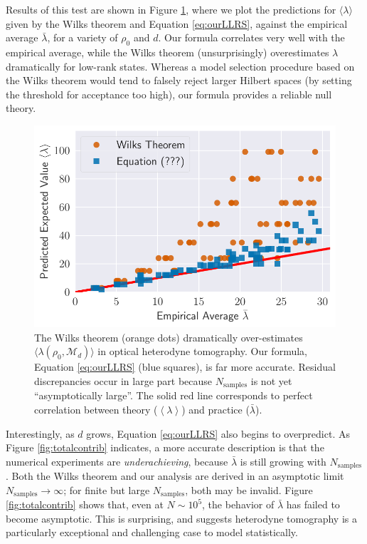 \documentclass[aps,pra, twocolumn]{revtex4-1}
\newcommand{\M}{\mathcal{M}}
\newcommand{\expect}[1]{\ensuremath{\left\langle#1\right\rangle}}
\begin{document}
Results of this test are shown in Figure \ref{fig:modelcomp}, where we plot the predictions for $\langle \lambda \rangle$ given by the Wilks theorem and Equation \eqref{eq:ourLLRS}, against the empirical average $\bar\lambda$, for a variety of $\rho_{0}$ and $d$. Our formula correlates very well with the empirical average, while the Wilks theorem (unsurprisingly) overestimates $\lambda$ dramatically for low-rank states.  Whereas a model selection procedure based on the Wilks theorem would tend to falsely reject larger Hilbert spaces (by setting the threshold for acceptance too high), our formula provides a reliable null theory.

\begin{figure}
 \includegraphics[width=\columnwidth]{Images/Figure_8.pdf}
 \caption{The Wilks theorem (orange dots) dramatically over-estimates $\langle\lambda(\rho_{0}, \M_{d})\rangle$ in optical heterodyne tomography. Our formula, Equation \ref{eq:ourLLRS} (blue squares), is far more accurate. Residual discrepancies occur in large part because $N_{\mathrm{samples}}$ is not yet ``asymptotically large''. The solid red line corresponds to perfect correlation between theory ($\expect{\lambda}$) and practice ($\bar\lambda$).}
 \label{fig:modelcomp}
\end{figure}

Interestingly, as $d$ grows, Equation \eqref{eq:ourLLRS} also begins to overpredict. As Figure \ref{fig:totalcontrib} indicates, a more accurate description is that the numerical experiments are \emph{underachieving}, because $\bar\lambda$ is still growing with $N_{\mathrm{samples}}$.  Both the Wilks theorem and our analysis are derived in an asymptotic limit $N_{\mathrm{samples}} \rightarrow \infty$; for finite but large $N_{\mathrm{samples}}$, both may be invalid.  Figure \ref{fig:totalcontrib} shows that, even at $N\sim 10^{5}$, the behavior of $\bar{\lambda}$ has failed to become asymptotic. This is surprising, and suggests heterodyne tomography is a particularly exceptional and challenging case to model statistically. 
\end{document}
